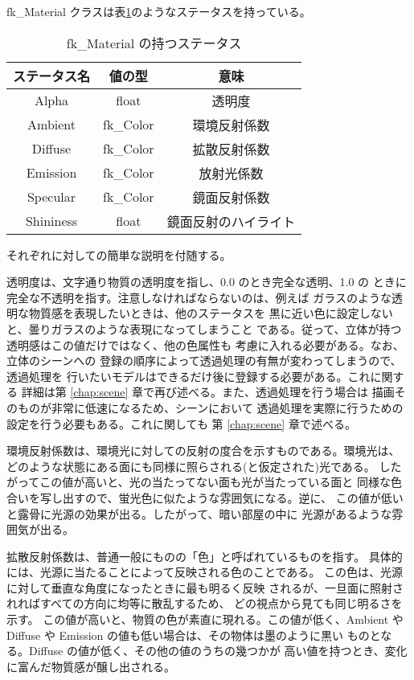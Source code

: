 fk\_Material クラスは表\ref{tbl:fkMaterial1}のようなステータスを持っている。

\begin{table}[H]
\caption{fk\_Material の持つステータス}
\label{tbl:fkMaterial1}
\begin{center}
\begin{tabular}{|c|c|c|}
\hline
ステータス名 & 値の型 & 意味 \\ \hline \hline
Alpha & float & 透明度 \\ \hline
Ambient & fk\_Color & 環境反射係数 \\ \hline
Diffuse & fk\_Color & 拡散反射係数 \\ \hline
Emission & fk\_Color & 放射光係数 \\ \hline
Specular & fk\_Color & 鏡面反射係数 \\ \hline
Shininess & float & 鏡面反射のハイライト \\ \hline
\end{tabular}
\end{center}
\end{table}
それぞれに対しての簡単な説明を付随する。

透明度は、文字通り物質の透明度を指し、0.0 のとき完全な透明、1.0 の
ときに完全な不透明を指す。注意しなければならないのは、例えば
ガラスのような透明な物質感を表現したいときは、他のステータスを
黒に近い色に設定しないと、曇りガラスのような表現になってしまうこと
である。従って、立体が持つ透明感はこの値だけではなく、他の色属性も
考慮に入れる必要がある。なお、立体のシーンへの
登録の順序によって透過処理の有無が変わってしまうので、透過処理を
行いたいモデルはできるだけ後に登録する必要がある。これに関する
詳細は第 \ref{chap:scene} 章で再び述べる。また、透過処理を行う場合は
描画そのものが非常に低速になるため、シーンにおいて
透過処理を実際に行うための設定を行う必要もある。これに関しても
第 \ref{chap:scene} 章で述べる。

環境反射係数は、環境光に対しての反射の度合を示すものである。環境光は、
どのような状態にある面にも同様に照らされる(と仮定された)光である。
したがってこの値が高いと、光の当たってない面も光が当たっている面と
同様な色合いを写し出すので、蛍光色に似たような雰囲気になる。逆に、
この値が低いと露骨に光源の効果が出る。したがって、暗い部屋の中に
光源があるような雰囲気が出る。

拡散反射係数は、普通一般にものの「色」と呼ばれているものを指す。
具体的には、光源に当たることによって反映される色のことである。
この色は、光源に対して垂直な角度になったときに最も明るく反映
されるが、一旦面に照射されればすべての方向に均等に散乱するため、
どの視点から見ても同じ明るさを示す。
この値が高いと、物質の色が素直に現れる。この値が低く、Ambient や
Diffuse や Emission の値も低い場合は、その物体は墨のように黒い
ものとなる。Diffuse の値が低く、その他の値のうちの幾つかが
高い値を持つとき、変化に富んだ物質感が醸し出される。

